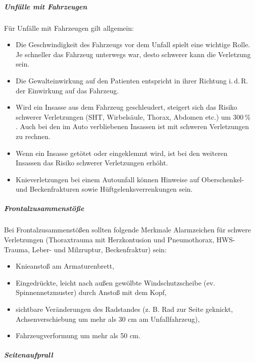 \subparagraph{Unfälle mit Fahrzeugen}

Für Unfälle mit Fahrzeugen gilt allgemein:

\begin{itemize}
  \item Die Geschwindigkeit des Fahrzeugs vor dem Unfall spielt eine wichtige 
  Rolle. Je schneller das Fahrzeug unterwegs  war, desto schwerer kann die
  Verletzung sein. 
  \item Die Gewalteinwirkung auf den Patienten entspricht in ihrer Richtung 
  i.\,d.\,R. der Einwirkung auf das Fahrzeug.
  \item Wird ein Insasse aus dem Fahrzeug geschleudert,
  steigert sich das Risiko schwerer Verletzungen (SHT,
  Wirbelsäule, Thorax, Abdomen etc.) um 300\,\%
  \cite{BoehmerTaschRett6}. Auch bei
  den im Auto verbliebenen Insassen ist mit schweren Verletzungen zu rechnen.
  \item Wenn ein Insasse getötet oder eingeklemmt wird, ist bei den weiteren 
  Insassen das Risiko schwerer Verletzungen erhöht.
  \item Knieverletzungen bei einem Autounfall können Hinweise auf Oberschenkel-
  und Beckenfrakturen sowie Hüftgelenksverrenkungen sein.
\end{itemize}

\subparagraph{Frontalzusammenstöße}

Bei Frontalzusammenstößen sollten folgende Merkmale
Alarmzeichen für schwere Verletzungen (Thoraxtrauma mit  Herzkontusion und
Pneumothorax, HWS-Trauma, Leber- und Milzruptur, Beckenfraktur) sein:
\begin{itemize}
    \item Knieanstoß am Armaturenbrett,
    \item Eingedrückte, leicht nach außen gewölbte Windschutzscheibe  (ev.
    Spinnennetzmuster) durch Anstoß mit dem Kopf,
    \item sichtbare Veränderungen des Radstandes (z. B. Rad zur Seite 
    geknickt, Achsenverschiebung um mehr als 30 cm am Unfallfahrzeug),
    \item Fahrzeugverformung um mehr als 50 cm.
\end{itemize}

\subparagraph{Seitenaufprall}

